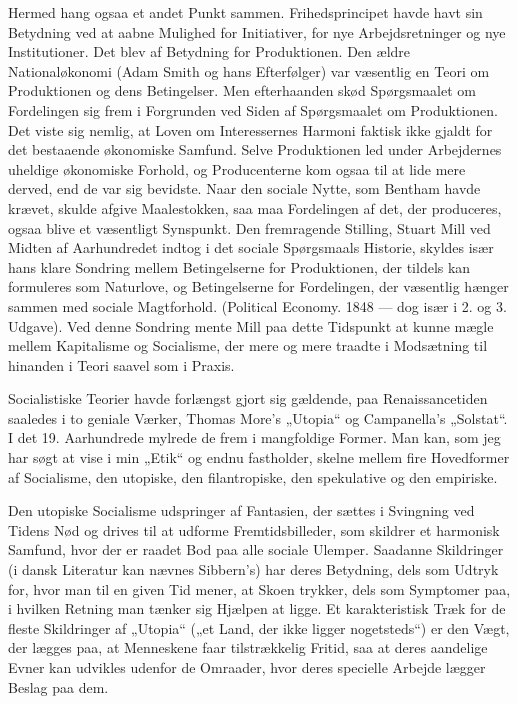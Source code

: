 \documentclass[12pt,a4paper,openany]{book}
\newcommand{\opage}[1]{\marginnote{\footnotesize\textit{[#1]}}}
\begin{document}
Hermed hang ogsaa et andet Punkt sammen. Frihedsprincipet
havde havt sin Betydning ved at aabne Mulighed for Initiativer, for
\opage{93}nye Arbejdsretninger og nye Institutioner. Det blev af Betydning for
Produktionen. Den ældre Nationaløkonomi (Adam Smith og hans
Efterfølger) var væsentlig en Teori om Produktionen og dens Betingelser.
Men efterhaanden skød Spørgsmaalet om Fordelingen sig
frem i Forgrunden ved Siden af Spørgsmaalet om Produktionen. Det
viste sig nemlig, at Loven om Interessernes Harmoni faktisk ikke
gjaldt for det bestaaende økonomiske Samfund. Selve Produktionen
led under Arbejdernes uheldige økonomiske Forhold, og Producenterne
kom ogsaa til at lide mere derved, end de var sig bevidste. Naar
den sociale Nytte, som Bentham havde krævet, skulde afgive Maalestokken,
saa maa Fordelingen af det, der produceres, ogsaa blive
et væsentligt Synspunkt. Den fremragende Stilling, Stuart Mill ved
Midten af Aarhundredet indtog i det sociale Spørgsmaals Historie,
skyldes især hans klare Sondring mellem Betingelserne for Produktionen,
der tildels kan formuleres som Naturlove, og Betingelserne
for Fordelingen, der væsentlig hænger sammen med sociale Magtforhold.
(Political Economy. 1848 --- dog især i 2. og 3. Udgave).
Ved denne Sondring mente Mill paa dette Tidspunkt at kunne
mægle mellem Kapitalisme og Socialisme, der mere og mere traadte
i Modsætning til hinanden i Teori saavel som i Praxis.

Socialistiske Teorier havde forlængst gjort sig gældende, paa Renaissancetiden
saaledes i to geniale Værker, Thomas More’s „Utopia“
og Campanella’s „Solstat“. I det 19. Aarhundrede mylrede de
frem i mangfoldige Former. Man kan, som jeg har søgt at vise i
min „Etik“ og endnu fastholder, skelne mellem fire Hovedformer af
Socialisme, den utopiske, den filantropiske, den spekulative og den
empiriske.

Den utopiske Socialisme udspringer af Fantasien, der sættes i
Svingning ved Tidens Nød og drives til at udforme Fremtidsbilleder,
som skildrer et harmonisk Samfund, hvor der er raadet Bod paa
alle sociale Ulemper. Saadanne Skildringer (i dansk Literatur kan
nævnes Sibbern’s) har deres Betydning, dels som Udtryk for, hvor
man til en given Tid mener, at Skoen trykker, dels som Symptomer
paa, i hvilken Retning man tænker sig Hjælpen at ligge. Et karakteristisk
Træk for de fleste Skildringer af „Utopia“ („et Land,
der ikke ligger nogetsteds“) er den Vægt, der lægges paa, at Menneskene
faar tilstrækkelig Fritid, saa at deres aandelige Evner kan udvikles
udenfor de Omraader, hvor deres specielle Arbejde lægger
Beslag paa dem.
\end{document}
